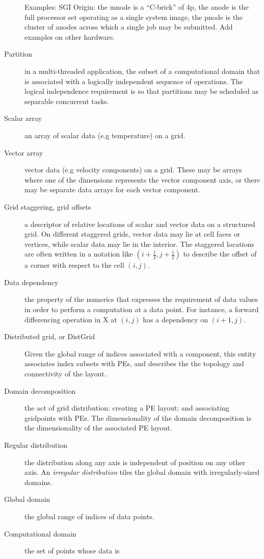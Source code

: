 \begin{description}
  Examples: SGI Origin: the mnode is a ``C-brick'' of 4p, the anode is
  the full processor set operating as a single system image, the pnode
  is the cluster of anodes across which a single job may be
  submitted. Add examples on other hardware.
\item[Partition] in a multi-threaded application, the subset of a
  computational domain that is associated with a logically independent
  sequence of operations. The logical independence requirement is so
  that partitions may be scheduled as separable concurrent tasks.
\item[Scalar array] an array of scalar data (e.g temperature) on a
  grid.
\item[Vector array] vector data (e.g velocity components) on a
  grid. These may be arrays where one of the dimensions represents the
  vector component axis, or there may be separate data arrays for each
  vector component.
\item[Grid staggering, grid offsets] a descriptor of relative locations
  of scalar and vector data on a structured grid. On different
  staggered grids, vector data may lie at cell faces or vertices,
  while scalar data may lie in the interior. The staggered locations
  are often written in a notation like $(i+\frac12,j+\frac12)$ to
  describe the offset of a corner with respect to the cell $(i,j)$.
\item[Data dependency] the property of the numerics that expresses the
  requirement of data values in order to perform a
  computation at a data point. For instance, a forward differencing
  operation in X at $(i,j)$ has a dependency on $(i+1,j)$.
\item[Distributed grid, or DistGrid] Given the global range of indices
  associated with a component, this entity associates index subsets
  with PEs, and describes the the topology and connectivity of the
  layout.
\item[Domain decomposition] the act of grid distribution: creating a
  PE layout; and associating gridpoints with PEs. The dimensionality
  of the domain decomposition is the dimensionality of the associated
  PE layout.
\item[Regular distribution] the distribution along any axis is
  independent of position on any other axis. An \emph{irregular
    distribution} tiles the global domain with irregularly-sized
  domains.
\item[Global domain] the global range of indices of data points.
\item[Computational domain] the set of points whose data is

\end{description}
